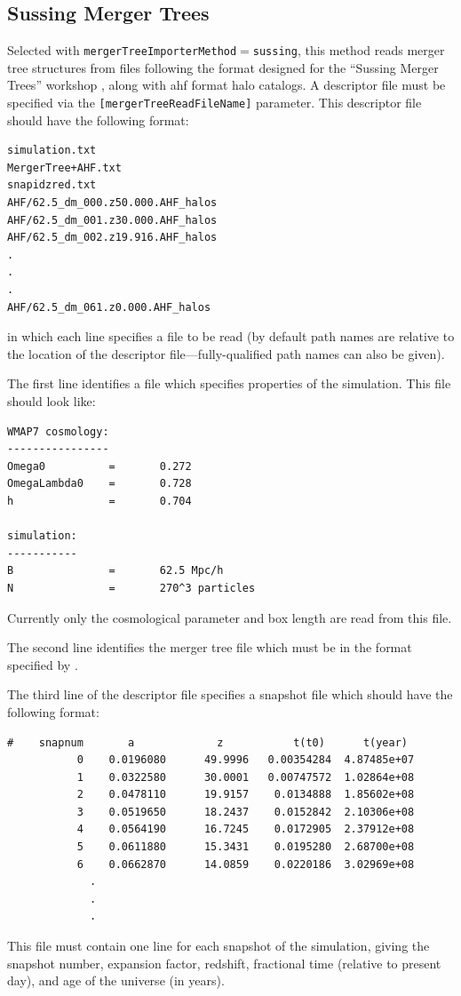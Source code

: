\subsection{Sussing Merger Trees}\label{phys:mergerTreeImporter:mergerTreeImporterSussing}

Selected with {\tt mergerTreeImporterMethod}$=${\tt sussing}, this method reads merger tree structures from files following the format designed for the ``Sussing Merger Trees'' workshop \citep{srisawat_sussing_2013}, along with \gls{ahf} format halo catalogs. A descriptor file must be specified via the {\tt [mergerTreeReadFileName]} parameter. This descriptor file should have the following format:
\begin{verbatim}
simulation.txt
MergerTree+AHF.txt
snapidzred.txt
AHF/62.5_dm_000.z50.000.AHF_halos
AHF/62.5_dm_001.z30.000.AHF_halos
AHF/62.5_dm_002.z19.916.AHF_halos
.
.
.
AHF/62.5_dm_061.z0.000.AHF_halos
\end{verbatim}
in which each line specifies a file to be read (by default path names are relative to the location of the descriptor file---fully-qualified path names can also be given).

The first line identifies a file which specifies properties of the simulation. This file should look like:
\begin{verbatim}
WMAP7 cosmology:
----------------
Omega0          =       0.272
OmegaLambda0    =       0.728
h               =       0.704

simulation:
-----------
B               =       62.5 Mpc/h
N               =       270^3 particles
\end{verbatim}
Currently only the cosmological parameter and box length are read from this file.

The second line identifies the merger tree file which must be in the format specified by \cite{srisawat_sussing_2013}.

The third line of the descriptor file specifies a snapshot file which should have the following format:
\begin{verbatim}
#    snapnum       a             z           t(t0)      t(year)
           0    0.0196080      49.9996   0.00354284  4.87485e+07
           1    0.0322580      30.0001   0.00747572  1.02864e+08
           2    0.0478110      19.9157    0.0134888  1.85602e+08
           3    0.0519650      18.2437    0.0152842  2.10306e+08
           4    0.0564190      16.7245    0.0172905  2.37912e+08
           5    0.0611880      15.3431    0.0195280  2.68700e+08
           6    0.0662870      14.0859    0.0220186  3.02969e+08
             .
             .
             .
\end{verbatim}
This file must contain one line for each snapshot of the simulation, giving the snapshot number, expansion factor, redshift, fractional time (relative to present day), and age of the universe (in years).

